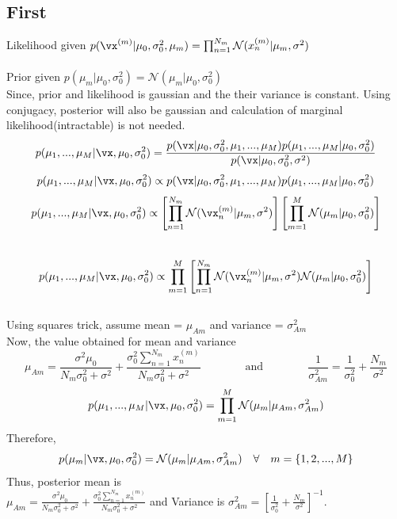\documentclass[a4paper,11pt]{article}
\begin{document}
\begin{pmisolution}
\section{First}
Likelihood given
\( p(\vx^{(m)}|\mu_{0},\sigma^{2}_{0}, \mu_{m}) = \prod_{n=1}^{N_{m}} \mathcal{N}(x_{n}^{(m)}| \mu_{m},\sigma^{2})\)\\
\\
Prior given
\( p(\mu_{m}|\mu_{0},\sigma^{2}_{0}) = \mathcal{N}(\mu_{m}| \mu_{0},\sigma^{2}_{0})\)\\

Since, prior and likelihood is gaussian and the their variance is constant. Using conjugacy, posterior will also be gaussian and calculation of marginal likelihood(intractable) is not needed. \\
\[p(\mu_{1},...,\mu_{M}|\vx,\mu_{0},\sigma^{2}_{0}) = \frac{p(\vx|\mu_{0},\sigma^{2}_{0}, \mu_{1},...,\mu_{M})p(\mu_{1},...,\mu_{M}|\mu_{0},\sigma^{2}_{0})}{p(\vx|\mu_{0},\sigma^{2}_{0},\sigma^{2})} \]
\[p(\mu_{1},...,\mu_{M}|\vx,\mu_{0},\sigma^{2}_{0}) \propto p(\vx|\mu_{0},\sigma^{2}_{0}, \mu_{1},...,\mu_{M})p(\mu_{1},...,\mu_{M}|\mu_{0},\sigma^{2}_{0}) \]
\[p(\mu_{1},...,\mu_{M}|\vx,\mu_{0},\sigma^{2}_{0}) \propto \left[ \prod_{n=1}^{N_{m}}\mathcal{N}(\vx_{n}^{(m)}| \mu_{m},\sigma^{2}) \right] \left[\prod_{m=1}^{M} \mathcal{N}(\mu_{m}| \mu_{0},\sigma^{2}_{0})\right] \]\\
\[p(\mu_{1},...,\mu_{M}|\vx,\mu_{0},\sigma^{2}_{0}) \propto \prod_{m=1}^{M} \left[ \prod_{n=1}^{N_{m}}\mathcal{N}(\vx_{n}^{(m)}| \mu_{m},\sigma^{2})\mathcal{N}(\mu_{m}| \mu_{0},\sigma^{2}_{0})\right]\]\\
Using squares trick, assume mean = \(\mu_{Am}\) and variance = \( \sigma_{Am}^{2}\)\\
Now, the value obtained for mean and variance \\
\[\mu_{Am} = \frac{\sigma^{2}\mu_{0}}{N_{m}\sigma_{0}^{2}+\sigma^{2}} + \frac{\sigma_{0}^{2}\sum_{n=1}^{N_{m}}x_{n}^{(m)}}{N_{m}\sigma_{0}^{2}+\sigma^{2}} \qquad \qquad \text{and} \qquad \qquad \frac{1}{\sigma_{Am}^{2}} = \frac{1}{\sigma_{0}^{2}} + \frac{N_{m}}{\sigma^{2}}\]
\[p(\mu_{1},...,\mu_{M}|\vx,\mu_{0},\sigma^{2}_{0}) = \prod_{m=1}^{M}\mathcal{N}(\mu_{m}|\mu_{Am}, \sigma_{Am}^{2}) \]
Therefore,
\[p(\mu_{m}|\vx,\mu_{0},\sigma^{2}_{0}) = \mathcal{N}(\mu_{m}|\mu_{Am}, \sigma_{Am}^{2}) \quad \forall \quad m =\{1,2,...,M\} \]
Thus, posterior mean is  \\
\( \mu_{Am} = \frac{\sigma^{2}\mu_{0}}{N_{m}\sigma_{0}^{2}+\sigma^{2}} + \frac{\sigma_{0}^{2}\sum_{n=1}^{N_{m}}x_{n}^{(m)}}{N_{m}\sigma_{0}^{2}+\sigma^{2}}\) and Variance is \( \sigma_{Am}^{2} = \left[ \frac{1}{\sigma_{0}^{2}} + \frac{N_{m}}{\sigma^{2}}\right]^{-1}\).

\end{pmisolution}
\end{document}
